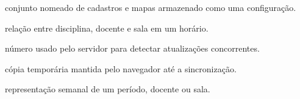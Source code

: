 \begin{description}[style=nextline,leftmargin=0pt]
  \item[Semestre] conjunto nomeado de cadastros e mapas armazenado como uma configuração.
  \item[Atribuição] relação entre disciplina, docente e sala em um horário.
  \item[Revisão] número usado pelo servidor para detectar atualizações concorrentes.
  \item[Rascunho local] cópia temporária mantida pelo navegador até a sincronização.
  \item[Mapa] representação semanal de um período, docente ou sala.
\end{description}
